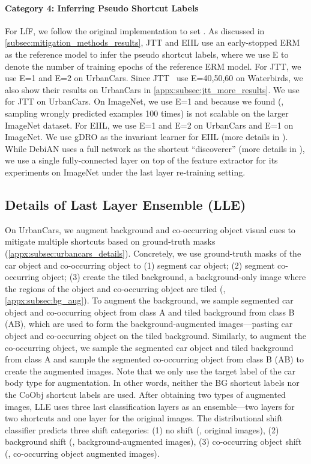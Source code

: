 \documentclass[10pt,twocolumn,letterpaper]{article}
\begin{document}
\paragraph{Category 4: Inferring Pseudo Shortcut Labels} For LfF, we follow the original implementation to set . As discussed in \cref{subsec:mitigation_methods_results}, JTT and EIIL use an early-stopped ERM as the reference model to infer the pseudo shortcut labels, where we use E to denote the number of training epochs of the reference ERM model. For JTT, we use E=1 and E=2 on UrbanCars. Since JTT~\cite{liu2021Int.Conf.Mach.Learn.Just} use E=40,50,60 on Waterbirds, we also show their results on UrbanCars in \cref{appx:subsec:jtt_more_results}. We use  for JTT on UrbanCars. On ImageNet, we use E=1 and  because we found  (\ie, sampling wrongly predicted examples 100 times) is not scalable on the larger ImageNet dataset. For EIIL, we use E=1 and E=2 on UrbanCars and E=1 on ImageNet. We use gDRO as the invariant learner for EIIL (more details in \cite{creager2021Int.Conf.Mach.Learn.Environment}). While DebiAN uses a full network as the shortcut ``discoverer'' (more details in \cite{li2022Eur.Conf.Comput.Vis.ECCVDiscovera}), we use a single fully-connected layer on top of the feature extractor for its experiments on ImageNet under the last layer re-training setting.

\subsection{Details of Last Layer Ensemble (LLE)}
\label{appx:subsec:lle_details}

On UrbanCars, we augment background and co-occurring object visual cues to mitigate multiple shortcuts based on ground-truth masks (\cf \cref{appx:subsec:urbancars_details}).
Concretely, we use ground-truth masks of the car object and co-occurring object to (1) segment car object; (2) segment co-occurring object; (3) create the tiled background, a background-only image where the regions of the object and co-occurring object are tiled (\cf, \cref{appx:subsec:bg_aug}). To augment the background, we sample segmented car object and co-occurring object from class A and tiled background from class B (AB), which are used to form the background-augmented images---pasting car object and co-occurring object on the tiled background. Similarly, to augment the co-occurring object, we sample the segmented car object and tiled background from class A and sample the segmented co-occurring object from class B (AB) to create the augmented images. Note that we only use the target label of the car body type for augmentation. In other words, neither the BG shortcut labels nor the CoObj shortcut labels are used. After obtaining two types of augmented images, LLE uses three last classification layers as an ensemble---two layers for two shortcuts and one layer for the original images. The distributional shift classifier predicts three shift categories: (1) no shift (\ie, original images), (2) background shift (\ie, background-augmented images), (3) co-occurring object shift (\ie, co-occurring object augmented images).
\end{document}
